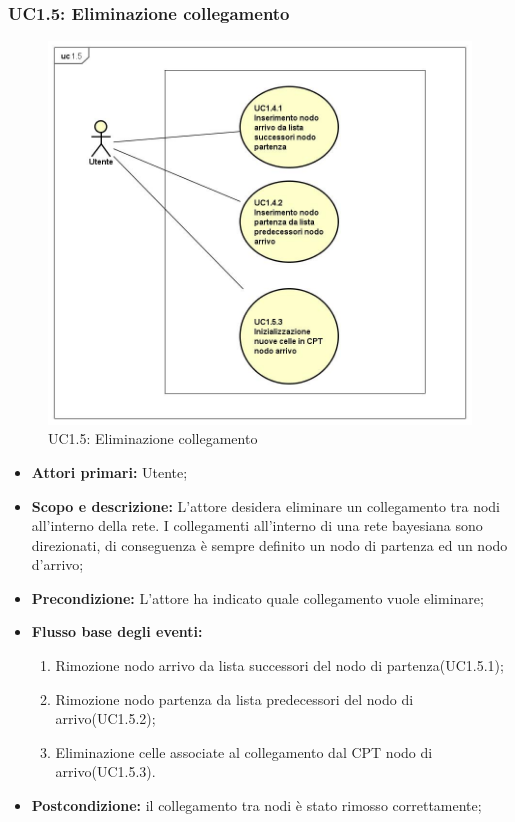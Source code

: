 \subsubsection{UC1.5: Eliminazione collegamento} 
\begin{figure} [H]
	\centering
	\includegraphics[scale=0.45]{Img/UC1-5} 
	\caption{UC1.5: Eliminazione collegamento} \label{} 
\end{figure} 
\begin{itemize} 
	\item{\textbf{Attori primari:} Utente;} 
	\item{\textbf{Scopo e descrizione:} L'attore desidera eliminare un collegamento tra nodi all'interno della rete. I collegamenti all'interno di una rete bayesiana sono direzionati, di conseguenza è sempre definito un nodo di partenza ed un nodo d'arrivo;} 
	\item{\textbf{Precondizione:} L'attore ha indicato quale collegamento vuole eliminare;} 
	\item{\textbf{Flusso base degli eventi:} } 
		\begin{enumerate} 
			\item{Rimozione nodo arrivo da lista successori del nodo di partenza(UC1.5.1);} 
			\item{Rimozione nodo partenza da lista predecessori del nodo di arrivo(UC1.5.2);} 
			\item{Eliminazione celle associate al collegamento dal CPT nodo di arrivo(UC1.5.3).} 
		\end{enumerate} 
	\item{\textbf{Postcondizione:} il collegamento tra nodi è stato rimosso correttamente;} 
\end{itemize} 
